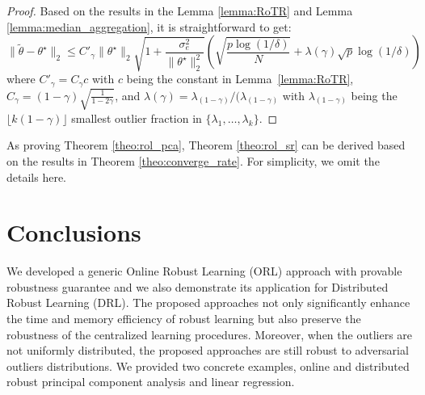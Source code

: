 \documentclass[11pt]{article}
\begin{document}
\begin{proof}
		Based on the results in the Lemma \ref{lemma:RoTR} and Lemma \ref{lemma:median_aggregation}, it is straightforward to get:
		\begin{equation*}
		\|\widetilde{\theta} -\theta^\star\|_2 \leq C'_\gamma \|\theta^\star\|_2\sqrt{1+\frac{\sigma_e^2}{\|\theta^\star\|_2^2}} 
		 \left(\sqrt{\frac{p\log (1/\delta)}{N}}  + \lambda(\gamma)\sqrt{p}\log (1/\delta)\right)
		\end{equation*}
		where $C'_\gamma = C_\gamma c$ with $c$ being the constant in Lemma~\ref{lemma:RoTR},  $ C_\gamma = (1-\gamma)\sqrt{\frac{1}{1-2\gamma}} $, and $\lambda(\gamma)=\lambda_{(1-\gamma)}/(\lambda_{(1-\gamma)}$ with $ \lambda_{(1-\gamma)}  $ being the $ \lfloor k (1-\gamma) \rfloor $ smallest outlier fraction in $ \{\lambda_1,\ldots,\lambda_k\} $.
	\end{proof}

	As proving Theorem \ref{theo:rol_pca}, Theorem \ref{theo:rol_sr} can be derived based on the results in Theorem \ref{theo:converge_rate}. For simplicity, we omit the details here.

\section{Conclusions}

We developed a generic  Online Robust Learning (ORL) approach with provable robustness guarantee  and we also demonstrate its application for  Distributed Robust Learning (DRL). The proposed approaches not only significantly enhance the time and memory efficiency of robust learning  but also preserve the robustness of the centralized learning procedures.  Moreover, when the outliers are not uniformly distributed, the proposed approaches are still robust to adversarial outliers distributions. We  provided two concrete examples, online and distributed robust principal component analysis and linear regression.%
\end{document}
